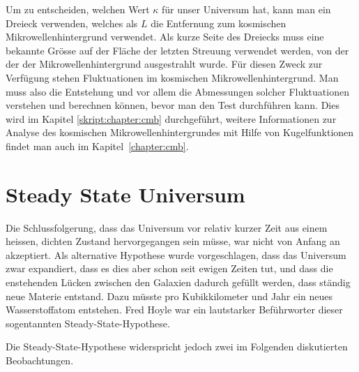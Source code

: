 Um zu entscheiden, welchen Wert $\kappa$ für unser Universum hat,
kann man ein Dreieck verwenden, welches als $L$ die Entfernung zum kosmischen
Mikrowellenhintergrund verwendet.
Als kurze Seite des Dreiecks muss eine bekannte Grösse auf der
Fläche der letzten Streuung verwendet werden, von der der der
Mikrowellenhintergrund ausgestrahlt wurde.
Für diesen Zweck zur Verfügung stehen Fluktuationen im kosmischen
Mikrowellenhintergrund.
%
%
%
Man muss also die Entstehung und vor allem die Abmessungen solcher
Fluktuationen verstehen und berechnen können, bevor man den Test
durchführen kann.
Dies wird im Kapitel \ref{skript:chapter:cmb} durchgeführt, weitere
Informationen zur Analyse des kosmischen Mikrowellenhintergrundes
mit Hilfe von Kugelfunktionen findet man auch im Kapitel~\ref{chapter:cmb}.

\section{Steady State Universum}
Die Schlussfolgerung, dass das Universum vor relativ kurzer Zeit
aus einem heissen, dichten 
Zustand hervorgegangen sein müsse, war nicht von Anfang an akzeptiert.
Als alternative Hypothese wurde vorgeschlagen, dass das Universum 
zwar expandiert, dass es dies aber schon seit ewigen Zeiten tut, und dass die
enstehenden
Lücken zwischen den Galaxien dadurch gefüllt werden, dass ständig
neue Materie entstand.
Dazu müsste pro Kubikkilometer und Jahr ein neues Wasserstoffatom
entstehen.
Fred Hoyle
%
war ein lautstarker Beführworter dieser sogentannten
Steady-State-Hypothese.
%

Die Steady-State-Hypothese widerspricht jedoch zwei
im Folgenden diskutierten Beobachtungen.

